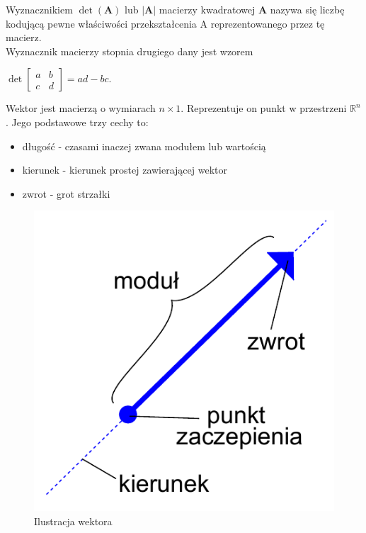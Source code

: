 \documentclass[a4paper,12pt,oneside]{book}
\begin{document}
			Wyznacznikiem $\det(\mathbf {A} )$ lub $|\mathbf {A} |$ macierzy kwadratowej $\mathbf  A$ nazywa się liczbę kodującą pewne właściwości przekształcenia $\mathrm {A}$ reprezentowanego przez tę macierz. \\
			
			Wyznacznik macierzy stopnia drugiego dany jest wzorem
			\begin{center}
					${\displaystyle \det {\begin{bmatrix}a&b\\c&d\end{bmatrix}}=ad-bc.}$\\
			\end{center}
		
			
			
			Wektor jest macierzą o wymiarach $n\times 1$. Reprezentuje on punkt w przestrzeni $\mathbb{R}^n$. Jego podstawowe trzy cechy to:
			\begin{itemize}
				\item długość - czasami inaczej zwana modułem lub wartością
				\item kierunek - kierunek prostej zawierającej wektor
				\item zwrot - grot strzałki
			\end{itemize}
		
			\begin{figure}[h!]
				\centering\includegraphics[scale=0.7]{Wektor_by_Zureks.pdf}
				\caption{Ilustracja wektora}
			\end{figure}
		
\end{document}
